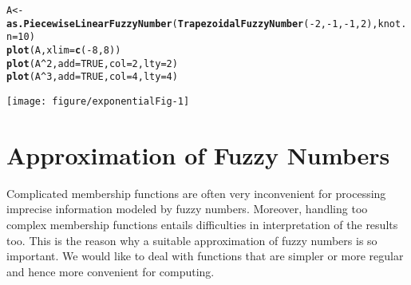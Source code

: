 \documentclass[11pt]{article}\usepackage[]{graphicx}\usepackage[]{color}
\makeatletter
\newcommand{\hlnum}[1]{\textcolor[rgb]{0.686,0.059,0.569}{#1}}%
\newcommand{\hlopt}[1]{\textcolor[rgb]{0,0,0}{#1}}%
\newcommand{\hlstd}[1]{\textcolor[rgb]{0.345,0.345,0.345}{#1}}%
\newcommand{\hlkwb}[1]{\textcolor[rgb]{0.69,0.353,0.396}{#1}}%
\newcommand{\hlkwc}[1]{\textcolor[rgb]{0.333,0.667,0.333}{#1}}%
\newcommand{\hlkwd}[1]{\textcolor[rgb]{0.737,0.353,0.396}{\textbf{#1}}}%
\newenvironment{kframe}{%
 \def\at@end@of@kframe{}%
 \ifinner\ifhmode%
  \def\at@end@of@kframe{\end{minipage}}%
  \begin{minipage}{\columnwidth}%
 \fi\fi%
 \def\FrameCommand##1{\hskip\@totalleftmargin \hskip-\fboxsep
 \colorbox{shadecolor}{##1}\hskip-\fboxsep
     \hskip-\linewidth \hskip-\@totalleftmargin \hskip\columnwidth}%
 \MakeFramed {\advance\hsize-\width
   \@totalleftmargin\z@ \linewidth\hsize
   \@setminipage}}%
 {\par\unskip\endMakeFramed%
 \at@end@of@kframe}
\newenvironment{knitrout}{}{} %
\makeatother
\begin{document}
\begin{knitrout}\small
{}\color{fgcolor}\begin{kframe}
\begin{alltt}
\hlstd{A} \hlkwb{<-} \hlkwd{as.PiecewiseLinearFuzzyNumber}\hlstd{(}\hlkwd{TrapezoidalFuzzyNumber}\hlstd{(}\hlopt{-}\hlnum{2}\hlstd{,}\hlopt{-}\hlnum{1}\hlstd{,}\hlopt{-}\hlnum{1}\hlstd{,}\hlnum{2}\hlstd{),} \hlkwc{knot.n}\hlstd{=}\hlnum{10}\hlstd{)}
\hlkwd{plot}\hlstd{(A,} \hlkwc{xlim}\hlstd{=}\hlkwd{c}\hlstd{(}\hlopt{-}\hlnum{8}\hlstd{,}\hlnum{8}\hlstd{))}
\hlkwd{plot}\hlstd{(A}\hlopt{^}\hlnum{2}\hlstd{,} \hlkwc{add}\hlstd{=}\hlnum{TRUE}\hlstd{,} \hlkwc{col}\hlstd{=}\hlnum{2}\hlstd{,} \hlkwc{lty}\hlstd{=}\hlnum{2}\hlstd{)}
\hlkwd{plot}\hlstd{(A}\hlopt{^}\hlnum{3}\hlstd{,} \hlkwc{add}\hlstd{=}\hlnum{TRUE}\hlstd{,} \hlkwc{col}\hlstd{=}\hlnum{4}\hlstd{,} \hlkwc{lty}\hlstd{=}\hlnum{4}\hlstd{)}
\end{alltt}
\end{kframe}
\end{knitrout}

\begin{center}
\begin{knitrout}\small
{}\color{fgcolor}

{\centering \texttt{[image: figure/exponentialFig-1]} 

}



\end{knitrout}
\end{center}





\section{Approximation of Fuzzy Numbers}\label{Sec:Approximation}


Complicated membership functions
are often very inconvenient for processing imprecise information modeled by
fuzzy numbers. Moreover, handling too complex membership
functions entails difficulties in interpretation of the results
too. This is the reason why a suitable approximation of fuzzy
numbers is so important. We would like to deal
with functions that are
simpler or more regular and hence more convenient for
computing.
\end{document}

